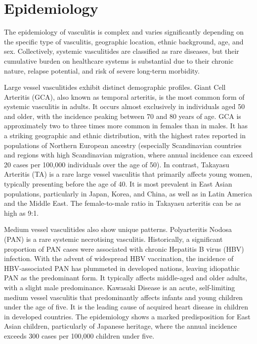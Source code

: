 \section*{Epidemiology}
The epidemiology of vasculitis is complex and varies significantly depending on the specific type of vasculitis, geographic location, ethnic background, age, and sex. Collectively, systemic vasculitides are classified as rare diseases, but their cumulative burden on healthcare systems is substantial due to their chronic nature, relapse potential, and risk of severe long-term morbidity.

Large vessel vasculitides exhibit distinct demographic profiles. Giant Cell Arteritis (GCA), also known as temporal arteritis, is the most common form of systemic vasculitis in adults. It occurs almost exclusively in individuals aged 50 and older, with the incidence peaking between 70 and 80 years of age. GCA is approximately two to three times more common in females than in males. It has a striking geographic and ethnic distribution, with the highest rates reported in populations of Northern European ancestry (especially Scandinavian countries and regions with high Scandinavian migration, where annual incidence can exceed 20 cases per 100,000 individuals over the age of 50). In contrast, Takayasu Arteritis (TA) is a rare large vessel vasculitis that primarily affects young women, typically presenting before the age of 40. It is most prevalent in East Asian populations, particularly in Japan, Korea, and China, as well as in Latin America and the Middle East. The female-to-male ratio in Takayasu arteritis can be as high as 9:1.

Medium vessel vasculitides also show unique patterns. Polyarteritis Nodosa (PAN) is a rare systemic necrotising vasculitis. Historically, a significant proportion of PAN cases were associated with chronic Hepatitis B virus (HBV) infection. With the advent of widespread HBV vaccination, the incidence of HBV-associated PAN has plummeted in developed nations, leaving idiopathic PAN as the predominant form. It typically affects middle-aged and older adults, with a slight male predominance. Kawasaki Disease is an acute, self-limiting medium vessel vasculitis that predominantly affects infants and young children under the age of five. It is the leading cause of acquired heart disease in children in developed countries. The epidemiology shows a marked predisposition for East Asian children, particularly of Japanese heritage, where the annual incidence exceeds 300 cases per 100,000 children under five.

